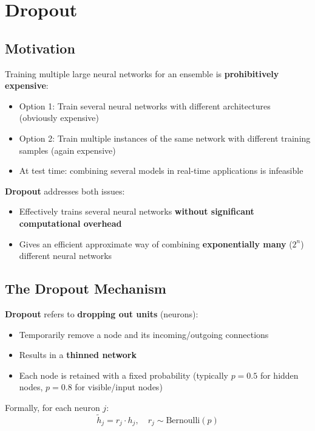 \documentclass[12pt,a4paper]{article}
\begin{document}
\section{Dropout}

\subsection{Motivation}

Training multiple large neural networks for an ensemble is \textbf{prohibitively expensive}:
\begin{itemize}
  \item Option 1: Train several neural networks with different architectures (obviously expensive)
  \item Option 2: Train multiple instances of the same network with different training samples (again expensive)
  \item At test time: combining several models in real-time applications is infeasible
\end{itemize}

\textbf{Dropout} addresses both issues:
\begin{itemize}
  \item Effectively trains several neural networks \textbf{without significant computational overhead}
  \item Gives an efficient approximate way of combining \textbf{exponentially many} ($2^n$) different neural networks
\end{itemize}

\subsection{The Dropout Mechanism}

\textbf{Dropout} refers to \textbf{dropping out units} (neurons):
\begin{itemize}
  \item Temporarily remove a node and its incoming/outgoing connections
  \item Results in a \textbf{thinned network}
  \item Each node is retained with a fixed probability (typically $p = 0.5$ for hidden nodes, $p = 0.8$ for visible/input nodes)
\end{itemize}

Formally, for each neuron $j$:
\[
\tilde{h}_j = r_j \cdot h_j,\quad r_j \sim \text{Bernoulli}(p)
\]
\end{document}
